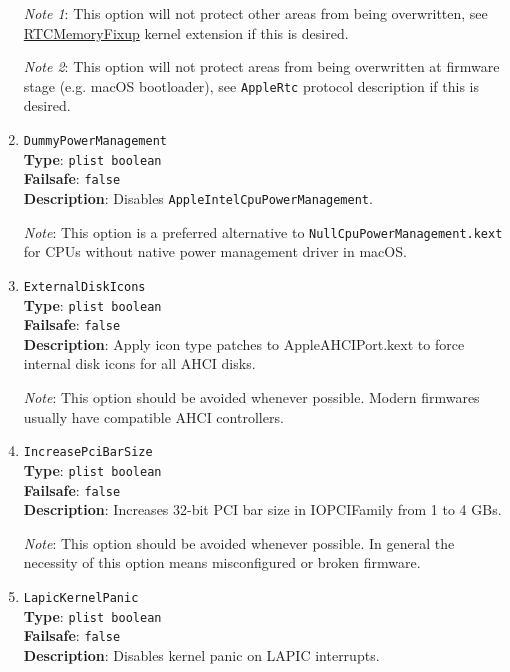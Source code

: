 \documentclass[]{article}
\begin{document}
\begin{enumerate}
  \emph{Note 1}: This option will not protect other areas from being overwritten,
  see \href{https://github.com/acidanthera/RTCMemoryFixup}{RTCMemoryFixup}
  kernel extension if this is desired.

  \emph{Note 2}: This option will not protect areas from being overwritten
  at firmware stage (e.g. macOS bootloader), see \texttt{AppleRtc} protocol
  description if this is desired.

\item
  \texttt{DummyPowerManagement}\\
  \textbf{Type}: \texttt{plist\ boolean}\\
  \textbf{Failsafe}: \texttt{false}\\
  \textbf{Description}: Disables \texttt{AppleIntelCpuPowerManagement}.

  \emph{Note}: This option is a preferred alternative to
  \texttt{NullCpuPowerManagement.kext} for CPUs without native power
  management driver in macOS.

\item
  \texttt{ExternalDiskIcons}\\
  \textbf{Type}: \texttt{plist\ boolean}\\
  \textbf{Failsafe}: \texttt{false}\\
  \textbf{Description}: Apply icon type patches to AppleAHCIPort.kext to force
  internal disk icons for all AHCI disks.

  \emph{Note}: This option should be avoided whenever possible. Modern firmwares
  usually have compatible AHCI controllers.

\item
  \texttt{IncreasePciBarSize}\\
  \textbf{Type}: \texttt{plist\ boolean}\\
  \textbf{Failsafe}: \texttt{false}\\
  \textbf{Description}: Increases 32-bit PCI bar size in IOPCIFamily from 1 to 4 GBs.

  \emph{Note}: This option should be avoided whenever possible. In general the necessity
  of this option means misconfigured or broken firmware.

\item
  \texttt{LapicKernelPanic}\\
  \textbf{Type}: \texttt{plist\ boolean}\\
  \textbf{Failsafe}: \texttt{false}\\
  \textbf{Description}: Disables kernel panic on LAPIC interrupts.


\end{enumerate}
\end{document}
